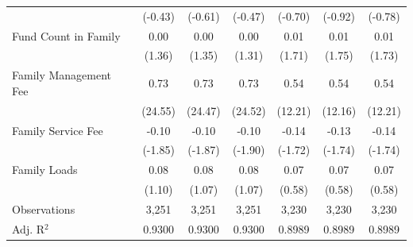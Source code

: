 {\begin{tabular}{l*{6}{c}}
                    &     (-0.43)         &     (-0.61)         &     (-0.47)         &     (-0.70)         &     (-0.92)         &     (-0.78)         \\
\addlinespace
Fund Count in Family&        0.00         &        0.00         &        0.00         &        0.01\sym{*}  &        0.01\sym{*}  &        0.01\sym{*}  \\
                    &      (1.36)         &      (1.35)         &      (1.31)         &      (1.71)         &      (1.75)         &      (1.73)         \\
\addlinespace
Family Management Fee&        0.73\sym{***}&        0.73\sym{***}&        0.73\sym{***}&        0.54\sym{***}&        0.54\sym{***}&        0.54\sym{***}\\
                    &     (24.55)         &     (24.47)         &     (24.52)         &     (12.21)         &     (12.16)         &     (12.21)         \\
\addlinespace
Family Service Fee  &       -0.10\sym{*}  &       -0.10\sym{*}  &       -0.10\sym{*}  &       -0.14\sym{*}  &       -0.13\sym{*}  &       -0.14\sym{*}  \\
                    &     (-1.85)         &     (-1.87)         &     (-1.90)         &     (-1.72)         &     (-1.74)         &     (-1.74)         \\
\addlinespace
Family Loads        &        0.08         &        0.08         &        0.08         &        0.07         &        0.07         &        0.07         \\
                    &      (1.10)         &      (1.07)         &      (1.07)         &      (0.58)         &      (0.58)         &      (0.58)         \\
\midrule
Observations        &       3,251         &       3,251         &       3,251         &       3,230         &       3,230         &       3,230         \\
Adj. R$^{2}$        &      0.9300         &      0.9300         &      0.9300         &      0.8989         &      0.8989         &      0.8989         \\
\bottomrule
\end{tabular}
}
